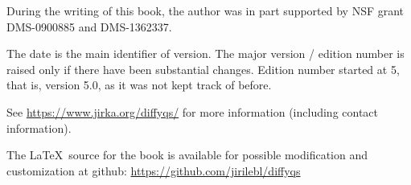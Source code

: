 \documentclass[12pt]{book}
\begin{document}
\begin{small}
\bigskip

\noindent
During the writing of this book, 
the author was in part supported by NSF grant DMS-0900885 and
DMS-1362337.

\bigskip

\noindent
The date is the main identifier of version.  The major version / edition
number is raised only if there have been substantial changes.
Edition
number started at 5, that is, version 5.0, as it was not kept track of
before.

\bigskip

\noindent
See \url{https://www.jirka.org/diffyqs/} for more information
(including contact information).

\bigskip

\noindent
The \LaTeX\ source for the book is available
for possible modification and customization
at github: \url{https://github.com/jirilebl/diffyqs}
\end{small}

\diffytableofcontents

\newpage















\addextraspacetotoc
\end{document}
